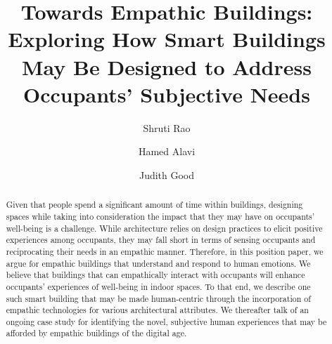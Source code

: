 \documentclass [sigconf] {acmart}
\begin{document}

\title{Towards Empathic Buildings: Exploring How Smart Buildings May Be Designed to Address Occupants’ Subjective Needs}


\author{Shruti Rao}

\author{Hamed Alavi}

\author{Judith Good}



\renewcommand{\shortauthors}{Rao et al.}

\begin{abstract}
Given that people spend a significant amount of time within buildings, designing spaces while taking into consideration the impact that they may have on occupants’ well-being is a challenge. While architecture relies on design practices to elicit positive experiences among occupants, they may fall short in terms of sensing occupants and reciprocating their needs in an empathic manner. Therefore, in this position paper, we argue for empathic buildings that understand and respond to human emotions. We believe that buildings that can empathically interact with occupants will enhance occupants’ experiences of well-being in indoor spaces. To that end, we describe one such smart building that may be made human-centric through the incorporation of empathic technologies for various architectural attributes. We thereafter talk of an ongoing case study for identifying the novel, subjective human experiences that may be afforded by empathic buildings of the digital age. 
\end{abstract}
\end{document}
